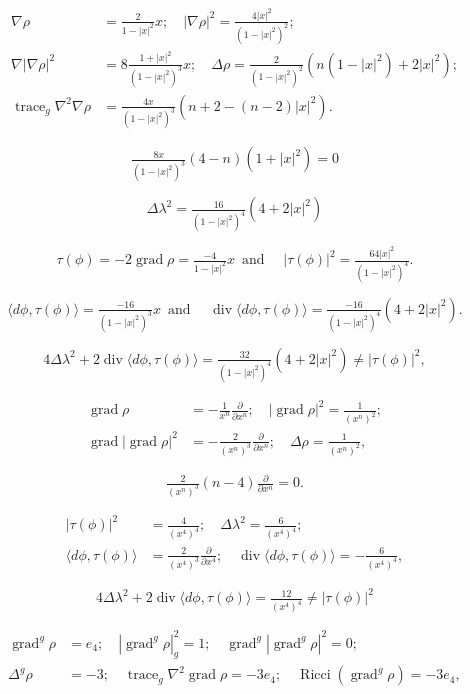 \documentclass[12pt]{article}
\begin{document}
\begin{align*}
\nabla \rho &= \tfrac{2}{1 - |x|^2}x ; \quad
|\nabla \rho|^2 = \tfrac{4|x|^2}{(1 - |x|^2)^2} ;\\
\nabla|\nabla \rho|^2 &= 8\tfrac{1 + |x|^2}{(1 - |x|^2)^3}x ; \quad
\Delta \rho = \tfrac{2}{(1 - |x|^2)^2}( n(1 - |x|^2) +2 |x|^2) ;\\
\operatorname{trace}_{g} \nabla^{2} \nabla \rho &= \tfrac{4x}{(1 - |x|^2)^3} (n+2 - (n-2) |x|^2) .
\end{align*}

$$ \tfrac{8x}{(1 - |x|^2)^3} (4-n)(1+ |x|^2) =0 $$

$$ \Delta \lambda^2 = \tfrac{16}{(1 - |x|^2)^4} (4 + 2  |x|^2)$$

$$\tau(\phi) = -2 \operatorname{grad} \rho = \tfrac{-4}{1 - |x|^2} x \, \mbox{ and } \quad
|\tau(\phi)|^2 = \tfrac{64|x|^2}{(1 - |x|^2)^4}  .$$

$$ \langle d\phi , \tau(\phi) \rangle = \tfrac{-16}{(1 - |x|^2)^3} x \, \mbox{ and } \quad
\operatorname{div} \langle d\phi , \tau(\phi) \rangle = \tfrac{-16}{(1 - |x|^2)^4} (4 + 2 |x|^2) .$$

$$ 4 \Delta \lambda^2 + 2 \operatorname{div} \langle d\phi , \tau(\phi) \rangle =
\tfrac{32}{(1 - |x|^2)^4} (4 + 2 |x|^2) \neq |\tau(\phi)|^2,$$

\begin{align*}
\operatorname{grad} \rho &= -\tfrac{1}{x^{n}}\tfrac{\partial}{\partial x^{n}} ; \quad  |\operatorname{grad} \rho|^2 = \tfrac{1}{(x^{n})^2} ;\\
\operatorname{grad} |\operatorname{grad} \rho|^2 &= -\tfrac{2}{(x^{n})^3}\tfrac{\partial}{\partial x^{n}} ; \quad \Delta
\rho = \tfrac{1}{(x^{n})^2},
\end{align*}

$$\tfrac{2}{(x^{n})^3}(n-4) \tfrac{\partial}{\partial x^{n}}=0.$$

\begin{align*}
|\tau(\phi)|^2 &= \tfrac{4}{(x^{4})^4} ; \quad \Delta \lambda^2 = \tfrac{6}{(x^{4})^4} ;\\
\langle d\phi , \tau(\phi) \rangle &= \tfrac{2}{(x^{4})^3}\tfrac{\partial}{\partial
x^{4}} ; \quad \operatorname{div} \langle d\phi , \tau(\phi) \rangle = -\tfrac{6}{(x^{4})^4},
\end{align*}

$$ 4\Delta \lambda^2 + 2 \operatorname{div} \langle d\phi , \tau(\phi) \rangle = \tfrac{12}{(x^{4})^4} \neq |\tau(\phi)|^2$$

\begin{align*}
\operatorname{grad}^g \rho &= e_4 ; \quad |\operatorname{grad}^g \rho|_{g}^2 = 1 ; \quad \operatorname{grad}^g|\operatorname{grad}^g \rho|^2 = 0 ;\\
\Delta^g \rho & = -3 ; \quad \operatorname{trace}_{g} \nabla^2 \operatorname{grad} \rho = -3 e_{4}; \quad \operatorname{Ricci}(\operatorname{grad}^g \rho)  = -3 e_4,
\end{align*}
\end{document}
